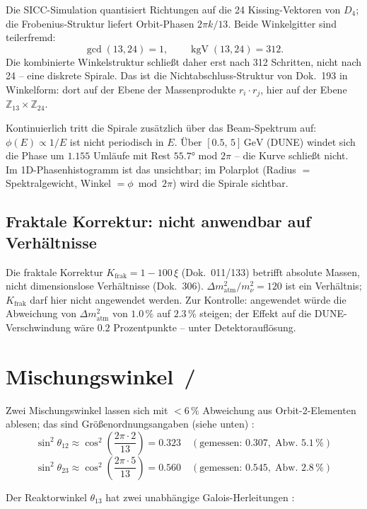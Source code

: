 Die SICC-Simulation quantisiert Richtungen auf die 24
Kissing-Vektoren von $D_4$; die Frobenius-Struktur liefert
Orbit-Phasen $2\pi k/13$. Beide Winkelgitter sind teilerfremd:
\[
\gcd(13,24)=1,\qquad \operatorname{kgV}(13,24)=312.
\]
Die kombinierte Winkelstruktur schließt daher erst nach 312
Schritten, nicht nach 24 -- eine diskrete Spirale. Das ist die
Nichtabschluss-Struktur von Dok.~193 in Winkelform: dort auf der
Ebene der Massenprodukte $r_i\cdot r_j$, hier auf der Ebene
$\mathbb{Z}_{13}\times\mathbb{Z}_{24}$.

Kontinuierlich tritt die Spirale zusätzlich über das Beam-Spektrum
auf: $\phi(E)\propto1/E$ ist nicht periodisch in $E$. Über
$[0.5,\,5]\,\text{GeV}$ (DUNE) windet sich die Phase um
$1.155$ Umläufe mit Rest $55.7°$ mod $2\pi$ -- die Kurve schließt
nicht. Im 1D-Phasenhistogramm ist das unsichtbar; im Polarplot
(Radius $=$ Spektralgewicht, Winkel $=\phi\bmod2\pi$) wird die
Spirale sichtbar.

\subsection{Fraktale Korrektur: nicht anwendbar auf Verhältnisse}

Die fraktale Korrektur $K_\text{frak}=1-100\,\xi$ (Dok.~011/133)
betrifft absolute Massen, nicht dimensionslose Verhältnisse
(Dok.~306). $\Delta m^2_\text{atm}/m_\nu^2=120$ ist ein Verhältnis;
$K_\text{frak}$ darf hier nicht angewendet werden. Zur Kontrolle:
angewendet würde die Abweichung von $\Delta m^2_\text{atm}$ von
$1.0\,\%$ auf $2.3\,\%$ steigen; der Effekt auf die
DUNE-Verschwindung wäre $0.2$ Prozentpunkte -- unter Detektorauflösung.

\section{Mischungswinkel \KM\,/\,\SM}

Zwei Mischungswinkel lassen sich mit $<6\,\%$ Abweichung aus
Orbit-2-Elementen ablesen; das sind Größenordnungsangaben (siehe unten) \SM:
\[
\sin^2\theta_{12}\approx\cos^2\!\left(\frac{2\pi\cdot2}{13}\right)=0.323
\quad(\text{gemessen: }0.307,\;\text{Abw.\ }5.1\,\%)
\]
\[
\sin^2\theta_{23}\approx\cos^2\!\left(\frac{2\pi\cdot5}{13}\right)=0.560
\quad(\text{gemessen: }0.545,\;\text{Abw.\ }2.8\,\%)
\]

Der Reaktorwinkel $\theta_{13}$ hat zwei unabhängige Galois-Herleitungen \KM:

